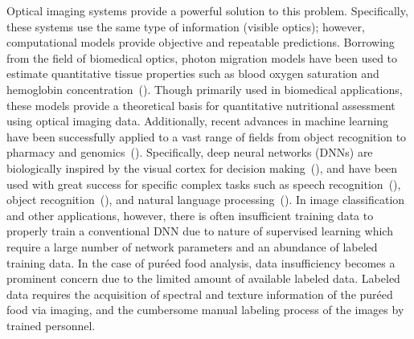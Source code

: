 \documentclass[authoryear]{elsarticle}
\begin{document}
Optical imaging systems provide a powerful solution to this problem. Specifically, these systems use the same type of information (visible optics); however, computational models provide objective and repeatable predictions. Borrowing from the field of biomedical optics, photon migration models have been used to estimate quantitative tissue properties such as blood oxygen saturation and hemoglobin concentration~(\cite{bigio2016}). Though primarily used in biomedical applications, these models provide a theoretical basis for quantitative nutritional assessment using optical imaging data. Additionally, recent advances in machine learning have been successfully applied to a vast range of fields from object recognition to pharmacy and genomics~(\cite{lecun2015}). Specifically, deep neural networks (DNNs) are biologically inspired by the visual cortex for decision making~(\cite{bengio2009}), and have been used with great success for specific complex tasks such as speech recognition~(\cite{hinton2012, dahl2012, hannun2014}), object recognition~(\cite{krizhevsky2012, he2015, lecun2004, simonyan2014}), and natural language processing~(\cite{bengio2003, collobert2008}). In image classification and other applications, however, there is often insufficient training data to properly train a conventional DNN due to nature of supervised learning which require a large number of network parameters and an abundance of labeled training data. In the case of pur\' eed food analysis, data insufficiency becomes a prominent concern due to the limited amount of available labeled data. Labeled data requires the acquisition of spectral and texture information of the pur\' eed food via imaging, and the cumbersome manual labeling process of the images by trained personnel.
\end{document}
